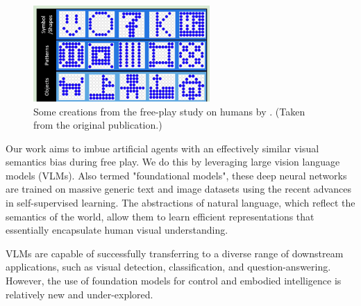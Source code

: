 
\begin{figure}[h]
    \centering
    \includegraphics[width=0.6\textwidth]{images/diggs.png}
    \caption{Some creations from the free-play study on humans by \cite{diggs}. (Taken from the original publication.)}
    \label{fig:diggs}
\end{figure}


Our work aims to imbue artificial agents with an effectively similar visual semantics bias during free play.
We do this by leveraging large vision language models (VLMs).
Also termed "foundational models", these deep neural networks are trained on massive generic text and image datasets using the recent advances in self-supervised learning. 
The abstractions of natural language, which reflect the semantics of the world, allow them to learn efficient representations that essentially encapsulate human visual understanding.

VLMs are capable of successfully transferring to a diverse range of downstream applications, such as visual detection, classification, and question-answering.
However, the use of foundation models for control and embodied intelligence is relatively new and under-explored.


